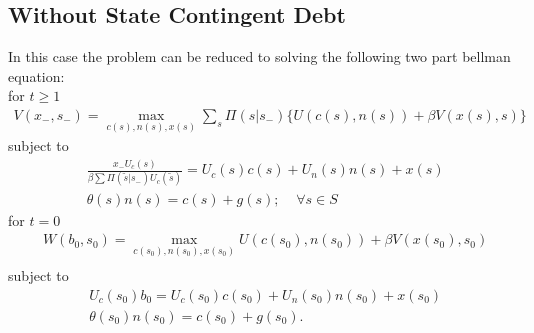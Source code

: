 \documentclass[12pt]{article}
\begin{document}
\subsection{Without State Contingent Debt}
In this case the problem can be reduced to solving the following two part bellman equation:\\
for $t\geq 1$ 
\begin{align*}
V(x_{-}, s_{-}) = \max_{c(s), n(s), x(s)} \sum_{s} \Pi(s|s_{-}) \{ U(c(s), n(s)) + \beta V(x(s), s) \}
\end{align*}
subject to 
\begin{align*}
& \frac{x_{-}U_c(s)}{\beta\sum \Pi(\tilde{s}|s_{-})U_c(\tilde{s}) } = U_c(s)c(s) + U_n(s)n(s) + x(s)  \\
& \theta(s) n(s) = c(s) + g(s) ; \; \; \; \; \forall s \in S
\end{align*}
for $t = 0$
\begin{align*}
& W(b_0, s_0) = \max_{c(s_0), n(s_0), x(s_0)}  U(c(s_0), n(s_0)) + \beta V(x(s_0), s_0)\\
\end{align*} 
subject to 
\begin{align*}
& U_c(s_0)b_0 = U_c(s_0)c(s_0) + U_n(s_0)n(s_0) + x(s_0)  \\
& \theta(s_0) n(s_0) = c(s_0) + g(s_0).
\end{align*}
\end{document}
